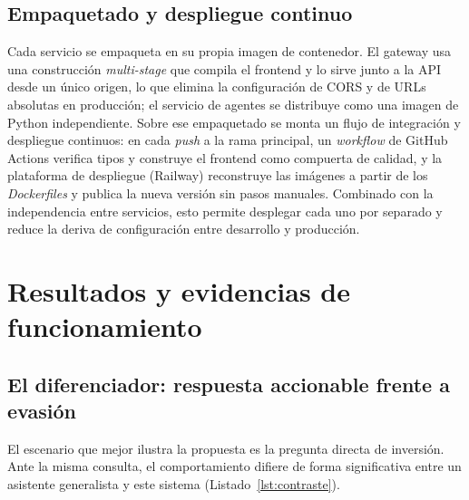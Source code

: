 \documentclass[runningheads]{llncs}
\begin{document}
\subsection{Empaquetado y despliegue continuo}

Cada servicio se empaqueta en su propia imagen de contenedor. El gateway usa una
construcción \emph{multi-stage} que compila el frontend y lo sirve junto a la API desde un
único origen, lo que elimina la configuración de CORS y de URLs absolutas en producción; el
servicio de agentes se distribuye como una imagen de Python independiente. Sobre ese
empaquetado se monta un flujo de integración y despliegue continuos: en cada \emph{push} a
la rama principal, un \emph{workflow} de GitHub Actions verifica tipos y construye el
frontend como compuerta de calidad, y la plataforma de despliegue (Railway) reconstruye las
imágenes a partir de los \emph{Dockerfiles} y publica la nueva versión sin pasos manuales.
Combinado con la independencia entre servicios, esto permite desplegar cada uno por separado
y reduce la deriva de configuración entre desarrollo y producción.

\section{Resultados y evidencias de funcionamiento}

\subsection{El diferenciador: respuesta accionable frente a evasión}

El escenario que mejor ilustra la propuesta es la pregunta directa de inversión. Ante la
misma consulta, el comportamiento difiere de forma significativa entre un asistente
generalista y este sistema (Listado~\ref{lst:contraste}).
\end{document}
